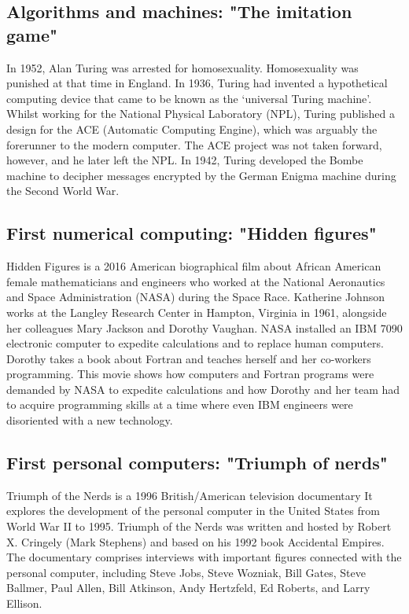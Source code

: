   
        \newpage 
        \subsection*{Algorithms and machines: "The imitation game"} 
 In 1952, Alan Turing was arrested for homosexuality. 
 Homosexuality was punished at that time in England. 
 In 1936, Turing had invented a hypothetical computing device that came to be known 
 as the ‘universal Turing machine’. 
 Whilst working for the National Physical Laboratory (NPL), 
 Turing published a design for the ACE (Automatic Computing Engine), which was 
 arguably the forerunner to the modern computer. 
 The ACE project was not taken forward, however, and he later left the NPL. 
 In 1942,  Turing developed the Bombe machine to decipher messages encrypted by the German Enigma 
 machine during the Second World War. 
 
   
   
        \subsection*{First numerical computing: "Hidden figures"}
 Hidden Figures is a 2016 American biographical  film 
 about African American female mathematicians and engineers 
 who worked at the National Aeronautics and Space Administration (NASA) 
 during the Space Race.
 Katherine Johnson works at the Langley Research Center in Hampton, Virginia in 1961, 
 alongside her colleagues Mary Jackson and Dorothy Vaughan. 
 NASA installed an IBM 7090 electronic computer to expedite calculations and to replace human computers. 
 Dorothy takes a book about Fortran and teaches herself and her co-workers programming. 
 This movie shows how computers and Fortran programs were demanded by NASA
 to expedite calculations and how Dorothy and her team had to acquire programming skills 
 at a time where even IBM engineers were disoriented with a new technology. 
 
  
   
  
        \subsection*{First personal computers: "Triumph of nerds"}
 Triumph of the Nerds is a 1996 British/American television documentary
 It explores the development of the personal computer in the United States from World War II to 1995. 
 Triumph of the Nerds was written and hosted by Robert X. Cringely (Mark Stephens) 
 and based on his 1992 book Accidental Empires. 
 The documentary comprises interviews with important figures connected with the personal computer, 
 including Steve Jobs, Steve Wozniak, Bill Gates, Steve Ballmer, Paul Allen, Bill Atkinson, 
 Andy Hertzfeld, Ed Roberts, and Larry Ellison. 
 
